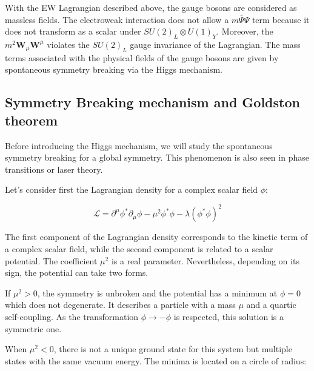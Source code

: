     With the EW Lagrangian described above, the gauge bosons are considered as massless fields.
    The electroweak interaction does not allow a $m\overline{\Psi}\Psi$ term because it does not transform as a scalar under $SU(2)_L \otimes U(1)_Y$.
    Moreover, the $m^2 \textbf{W}_{\mu} \textbf{W}^{\mu}$ violates the $SU(2)_L$ gauge invariance of the Lagrangian.
    The mass terms associated with the physical fields of the gauge bosons are given by spontaneous symmetry breaking via the Higgs mechanism.




     \subsection{Symmetry Breaking mechanism and Goldston theorem}
    
    Before introducing the Higgs mechanism, we will study the spontaneous symmetry breaking for a global symmetry.
    This phenomenon is also seen in phase transitions or laser theory.

    Let's consider first the Lagrangian density for a complex scalar field $\phi$:

    \begin{equation}
      \mathcal{L} = \partial^{\mu}\phi^{*} \partial_{\mu}\phi - \mu^2\phi^{*}\phi - \lambda (\phi^{*}\phi)^2
      \label{eq:ssbLagrangian}
    \end{equation}

    The first component of the Lagrangian density corresponds to the kinetic term of a complex scalar field, while the second component is related to a scalar potential.
    The coefficient $\mu^2$ is a real parameter. Nevertheless, depending on its sign, the potential can take two forms.

    If $\mu^{2} > 0$, the symmetry is unbroken and the potential has a minimum at $\phi = 0$ which does not degenerate.
    It describes a particle with a mass $\mu$ and a quartic self-coupling.
    As the transformation $\phi \rightarrow  - \phi$ is respected, this solution is a symmetric one.

    When $\mu^{2} < 0$, there is not a unique ground state for this system but multiple states with the same vacuum energy.
    The minima is located on a circle of radius:

